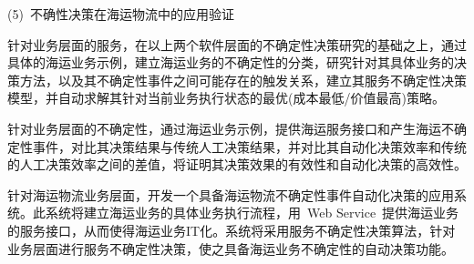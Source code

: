 (5)~不确性决策在海运物流中的应用验证

针对业务层面的服务，在以上两个软件层面的不确定性决策研究的基础之上，通过具体的海运业务示例，建立海运业务的不确定性的分类，研究针对其具体业务的决策方法，以及其不确定性事件之间可能存在的触发关系，建立其服务不确定性决策模型，并自动求解其针对当前业务执行状态的最优(成本最低/价值最高)策略。

针对业务层面的不确定性，通过海运业务示例，提供海运服务接口和产生海运不确定性事件，对比其决策结果与传统人工决策结果，并对比其自动化决策效率和传统的人工决策效率之间的差值，将证明其决策效果的有效性和自动化决策的高效性。

针对海运物流业务层面，开发一个具备海运物流不确定性事件自动化决策的应用系统。此系统将建立海运业务的具体业务执行流程，用~Web Service~提供海运业务的服务接口，从而使得海运业务IT化。系统将采用服务不确定性决策算法，针对业务层面进行服务不确定性决策，使之具备海运业务不确定性的自动决策功能。
